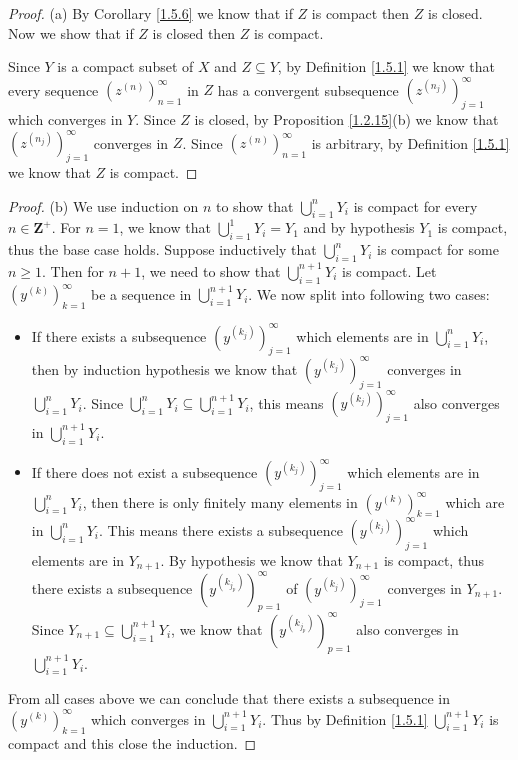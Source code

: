 \begin{proof}{(a)}
    By Corollary \ref{1.5.6} we know that if \(Z\) is compact then \(Z\) is closed.
    Now we show that if \(Z\) is closed then \(Z\) is compact.

    Since \(Y\) is a compact subset of \(X\) and \(Z \subseteq Y\), by Definition \ref{1.5.1} we know that every sequence \((z^{(n)})_{n = 1}^\infty\) in \(Z\) has a convergent subsequence \((z^{(n_j)})_{j = 1}^\infty\) which converges in \(Y\).
    Since \(Z\) is closed, by Proposition \ref{1.2.15}(b) we know that \((z^{(n_j)})_{j = 1}^\infty\) converges in \(Z\).
    Since \((z^{(n)})_{n = 1}^\infty\) is arbitrary, by Definition \ref{1.5.1} we know that \(Z\) is compact.
\end{proof}

\begin{proof}{(b)}
    We use induction on \(n\) to show that \(\bigcup_{i = 1}^n Y_i\) is compact for every \(n \in \mathbf{Z}^+\).
    For \(n = 1\), we know that \(\bigcup_{i = 1}^1 Y_i = Y_1\) and by hypothesis \(Y_1\) is compact, thus the base case holds.
    Suppose inductively that \(\bigcup_{i = 1}^n Y_i\) is compact for some \(n \geq 1\).
    Then for \(n + 1\), we need to show that \(\bigcup_{i = 1}^{n + 1} Y_i\) is compact.
    Let \((y^{(k)})_{k = 1}^\infty\) be a sequence in \(\bigcup_{i = 1}^{n + 1} Y_i\).
    We now split into following two cases:
    \begin{itemize}
        \item If there exists a subsequence \((y^{(k_j)})_{j = 1}^\infty\) which elements are in \(\bigcup_{i = 1}^n Y_i\), then by induction hypothesis we know that \((y^{(k_j)})_{j = 1}^\infty\) converges in \(\bigcup_{i = 1}^n Y_i\).
              Since \(\bigcup_{i = 1}^n Y_i \subseteq \bigcup_{i = 1}^{n + 1} Y_i\), this means \((y^{(k_j)})_{j = 1}^\infty\) also converges in \(\bigcup_{i = 1}^{n + 1} Y_i\).
        \item If there does not exist a subsequence \((y^{(k_j)})_{j = 1}^\infty\) which elements are in \(\bigcup_{i = 1}^n Y_i\), then there is only finitely many elements in \((y^{(k)})_{k = 1}^\infty\) which are in \(\bigcup_{i = 1}^n Y_i\).
              This means there exists a subsequence \((y^{(k_j)})_{j = 1}^\infty\) which elements are in \(Y_{n + 1}\).
              By hypothesis we know that \(Y_{n + 1}\) is compact, thus there exists a subsequence \((y^{(k_{j_p})})_{p = 1}^\infty\) of \((y^{(k_j)})_{j = 1}^\infty\) converges in \(Y_{n + 1}\).
              Since \(Y_{n + 1} \subseteq \bigcup_{i = 1}^{n + 1} Y_i\), we know that \((y^{(k_{j_p})})_{p = 1}^\infty\) also converges in \(\bigcup_{i = 1}^{n + 1} Y_i\).
    \end{itemize}
    From all cases above we can conclude that there exists a subsequence in \((y^{(k)})_{k = 1}^\infty\) which converges in \(\bigcup_{i = 1}^{n + 1} Y_i\).
    Thus by Definition \ref{1.5.1} \(\bigcup_{i = 1}^{n + 1} Y_i\) is compact and this close the induction.
\end{proof}

